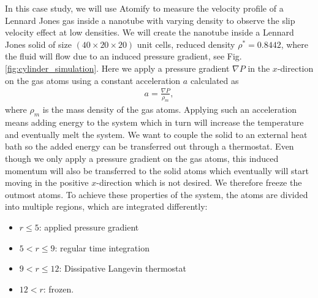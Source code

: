 \documentclass[aps,pre,twocolumn,letterpaper,floatfix,nofootinbib]{revtex4}
\begin{document}
In this case study, we will use Atomify to measure the velocity profile of a Lennard Jones gas inside a nanotube with varying density to observe the slip velocity effect at low densities.
We will create the nanotube inside a Lennard Jones solid of size  $(40\times20\times20)$ unit cells, reduced density $\rho^* = 0.8442$, where the fluid will flow due to an induced pressure gradient, see Fig. \ref{fig:cylinder_simulation}.
Here we apply a pressure gradient $\nabla P$ in the $x$-direction on the gas atoms using a constant acceleration $a$ calculated as
\begin{align}
	a = \frac{\nabla P}{\rho_m},
\end{align}
where $\rho_m$ is the mass density of the gas atoms.
Applying such an acceleration means adding energy to the system which in turn will increase the temperature and eventually melt the system.
We want to couple the solid to an external heat bath so the added energy can be transferred out through a thermostat.
Even though we only apply a pressure gradient on the gas atoms, this induced momentum will also be transferred to the solid atoms which eventually will start moving in the positive $x$-direction which is not desired.
We therefore freeze the outmost atoms.
To achieve these properties of the system, the atoms are divided into multiple regions, which are integrated differently:

\begin{itemize}  
	\item $r \leq 5$: applied pressure gradient
	\item $5 < r \leq 9$: regular time integration
	\item $9 < r \leq 12$: Dissipative Langevin thermostat
	\item $12 < r$: frozen.
\end{itemize}
\end{document}
